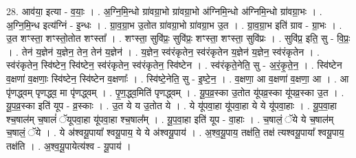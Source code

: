 \documentclass[17pt]{extarticle}
\begin{document}
28. आव॑या॒ इत्या - व॒याः॒ । . अ॒ग्नि॒मि॒न्धो ग्रा॑वग्रा॒भो ग्रा॑वग्रा॒भो अ॑ग्निमि॒न्धो अ॑ग्निमि॒न्धो ग्रा॑वग्रा॒भः । . अ॒ग्नि॒मि॒न्ध इत्य॑ग्निं - इ॒न्धः । . ग्रा॒व॒ग्रा॒भ उ॒तोत ग्रा॑वग्रा॒भो ग्रा॑वग्रा॒भ उ॒त । . ग्रा॒व॒ग्रा॒भ इति॑ ग्राव - ग्रा॒भः । . उ॒त शꣳस्ता॒ शꣳस्तो॒तोत शꣳस्ता᳚ । . शꣳस्ता॒ सुवि॑प्रः॒ सुवि॑प्रः॒ शꣳस्ता॒ शꣳस्ता॒ सुवि॑प्रः । . सुवि॑प्र॒ इति॒ सु - वि॒प्रः॒ । . तेन॑ य॒ज्ञेन॑ य॒ज्ञेन॒ तेन॒ तेन॑ य॒ज्ञेन॑ । . य॒ज्ञेन॒ स्व॑रंकृतेन॒ स्व॑रंकृतेन य॒ज्ञेन॑ य॒ज्ञेन॒ स्व॑रंकृतेन । . स्व॑रंकृतेन॒ स्वि॑ष्टेन॒ स्वि॑ष्टेन॒ स्व॑रंकृतेन॒ स्व॑रंकृतेन॒ स्वि॑ष्टेन । . स्व॑रंकृते॒नेति॒ सु - अ॒रं॒कृ॒ते॒न॒ । . स्वि॑ष्टेन व॒क्षणा॑ व॒क्षणाः॒ स्वि॑ष्टेन॒ स्वि॑ष्टेन व॒क्षणाः᳚ । . स्वि॑ष्टे॒नेति॒ सु - इ॒ष्टे॒न॒ । . व॒क्षणा॒ आ व॒क्षणा॑ व॒क्षणा॒ आ । . आ पृ॑णद्ध्वम् पृणद्ध्व॒ मा पृ॑णद्ध्वम् । . पृ॒ण॒द्ध्व॒मिति॑ पृणद्ध्वम् । . यू॒प॒व्र॒स्का उ॒तोत यू॑पव्र॒स्का यू॑पव्र॒स्का उ॒त । . यू॒प॒व्र॒स्का इति॑ यूप - व्र॒स्काः । . उ॒त ये य उ॒तोत ये । . ये यू॑पवा॒हा यू॑पवा॒हा ये ये यू॑पवा॒हाः । . यू॒प॒वा॒हा श्च॒षाल॑म् च॒षालं॑ ॅयूपवा॒हा यू॑पवा॒हा श्च॒षाल᳚म् । . यू॒प॒वा॒हा इति॑ यूप - वा॒हाः । . च॒षालं॒ ॅये ये च॒षाल॑म् च॒षालं॒ ॅये । . ये अ॑श्वयू॒पाया᳚ श्वयू॒पाय॒ ये ये अ॑श्वयू॒पाय॑ । . अ॒श्व॒यू॒पाय॒ तक्ष॑ति॒ तक्ष॑ त्यश्वयू॒पाया᳚ श्वयू॒पाय॒ तक्ष॑ति । . अ॒श्व॒यू॒पायेत्य॑श्व - यू॒पाय॑ । \newline
\end{document}
